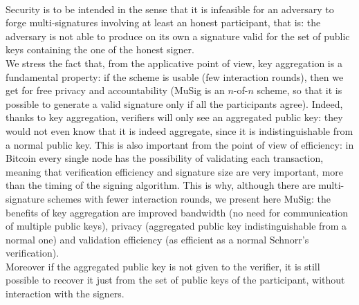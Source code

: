 \\
Security is to be intended in the sense that it is infeasible for an adversary to forge multi-signatures involving at least an honest participant, that is: the adversary is not able to produce on its own a signature valid for the set of public keys containing the one of the honest signer.
\\
We stress the fact that, from the applicative point of view, key aggregation is a fundamental property: if the scheme is usable (few interaction rounds), then we get for free privacy and accountability (MuSig is an $n$-of-$n$ scheme, so that it is possible to generate a valid signature only if all the participants agree). Indeed, thanks to key aggregation, verifiers will only see an aggregated public key: they would not even know that it is indeed aggregate, since it is indistinguishable from a normal public key. This is also important from the point of view of efficiency: in Bitcoin every single node has the possibility of validating each transaction, meaning that verification efficiency and signature size are very important, more than the timing of the signing algorithm. This is why, although there are multi-signature schemes with fewer interaction rounds, we present here MuSig: the benefits of key aggregation are improved bandwidth (no need for communication of multiple public keys), privacy (aggregated public key indistinguishable from a normal one) and validation efficiency (as efficient as a normal Schnorr's verification).
\\
Moreover if the aggregated public key is not given to the verifier, it is still possible to recover it just from the set of public keys of the participant, without interaction with the signers.

